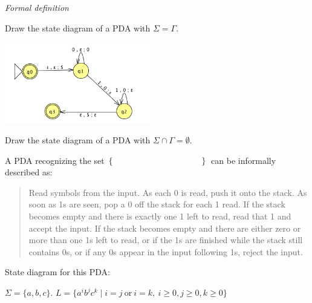 \begin{multicols}{2}
    {\it Formal definition}
    
    \vspace{90pt}
    Draw the state diagram of a PDA with $\Sigma = \Gamma$.
    
    \columnbreak 
    \includegraphics[height=100pt]{../../resources/machines/Lect9PDA.png}
    
    
    Draw the state diagram of a PDA with $\Sigma \cap \Gamma = \emptyset$.
    
\end{multicols}
    
\vspace{60pt}
    
A PDA recognizing the set $\{ \hspace{1.5 in} \}$ can be informally described as:
\begin{quote}
    Read symbols from the input. As each 0 is read, push it onto the stack. As soon as 1s are seen, pop a 0 off the stack for each 1 read. If the stack becomes empty and there is exactly one 1 left to read, read that 1 and accept the input. If the stack becomes empty and there are either zero or more than one 1s left to read, or if the 1s are finished while the stack still contains 0s, or if any 0s appear in the input following 1s, reject the input.
\end{quote}
    
    State diagram for this  PDA:
    
    \vspace{60pt}
    
$\Sigma = \{a,b,c\}$.  $L = \{ a^i b^j c^k \mid  i=j ~\text{or}~ i=k, ~i\geq 0, j \geq 0, k \geq 0\}$
    
\vfill